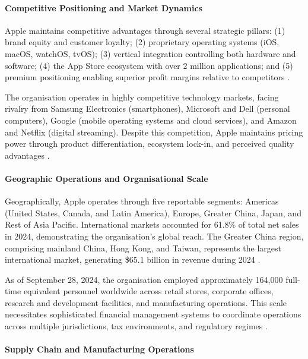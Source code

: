 \documentclass[12pt,a4paper]{article}
\begin{document}
\paragraph{Competitive Positioning and Market Dynamics}

Apple maintains competitive advantages through several strategic pillars: (1) brand equity and customer loyalty; (2) proprietary operating systems (iOS, macOS, watchOS, tvOS); (3) vertical integration controlling both hardware and software; (4) the App Store ecosystem with over 2 million applications; and (5) premium positioning enabling superior profit margins relative to competitors \citep{kieso2023}.

The organisation operates in highly competitive technology markets, facing rivalry from Samsung Electronics (smartphones), Microsoft and Dell (personal computers), Google (mobile operating systems and cloud services), and Amazon and Netflix (digital streaming). Despite this competition, Apple maintains pricing power through product differentiation, ecosystem lock-in, and perceived quality advantages \citep{brealey2020}.

\paragraph{Geographic Operations and Organisational Scale}

Geographically, Apple operates through five reportable segments: Americas (United States, Canada, and Latin America), Europe, Greater China, Japan, and Rest of Asia Pacific. International markets accounted for 61.8\% of total net sales in 2024, demonstrating the organisation's global reach. The Greater China region, comprising mainland China, Hong Kong, and Taiwan, represents the largest international market, generating \$65.1 billion in revenue during 2024 \citep{apple202410k}.

As of September 28, 2024, the organisation employed approximately 164,000 full-time equivalent personnel worldwide across retail stores, corporate offices, research and development facilities, and manufacturing operations. This scale necessitates sophisticated financial management systems to coordinate operations across multiple jurisdictions, tax environments, and regulatory regimes \citep{apple202410k}.

\paragraph{Supply Chain and Manufacturing Operations}
\end{document}
